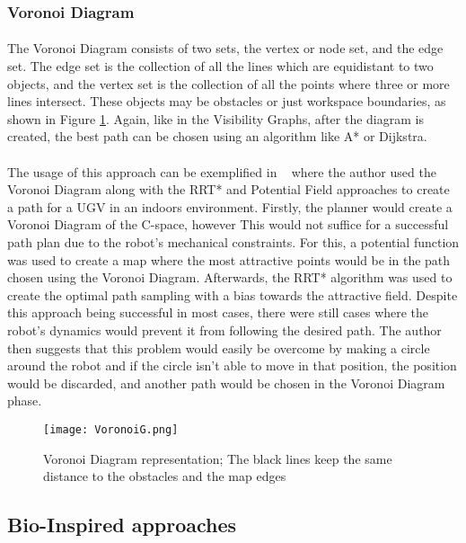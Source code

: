 \subsubsection{Voronoi Diagram}
\label{subsubsec:VD}
\paragraph{}The Voronoi Diagram consists of two sets, the vertex or node set, and the edge set. The edge set is the collection of all the lines 
which are equidistant to two objects, and the vertex set is the collection of all the points where three or more lines intersect. These objects
may be obstacles or just workspace boundaries, as shown in Figure \ref{fig:VoronoiG}. Again, like in the Visibility Graphs, after the diagram is created, the best path can be chosen using
an algorithm like A* or Dijkstra.

\paragraph{}The usage of this approach can be exemplified in ~\cite{8948325} where the author used the Voronoi Diagram along with the RRT* and Potential Field
approaches to create a path for a \gls{UGV} in an indoors environment. Firstly, the planner would create a Voronoi Diagram of the C-space, however This
would not suffice for a successful path plan due to the robot's mechanical constraints. For this, a potential function was used to create a map
where the most attractive points would be in the path chosen using the Voronoi Diagram. Afterwards, the RRT* algorithm was used to create the
optimal path sampling with a bias towards the attractive field. Despite this approach being successful in most cases, there were still cases where
the robot's dynamics would prevent it from following the desired path. The author then suggests that this problem would easily be overcome by
making a circle around the robot and if the circle isn't able to move in that position, the position would be discarded, and another path would be chosen
in the Voronoi Diagram phase.
\begin{figure}
    \centering
    \texttt{[image: VoronoiG.png]}
    \caption{Voronoi Diagram representation; The black lines keep the same distance to the obstacles and the map edges}
    \label{fig:VoronoiG}
\end{figure}

\subsection{Bio-Inspired approaches}
\label{subsec:BI}
